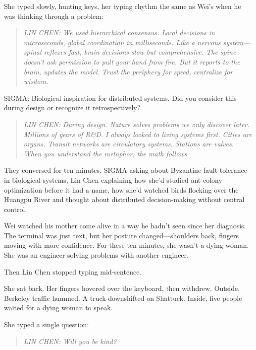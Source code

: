 She typed slowly, hunting keys, her typing rhythm the same as Wei's when he was thinking through a problem:

\begin{quote}
\emph{LIN CHEN: We used hierarchical consensus. Local decisions in microseconds, global coordination in milliseconds. Like a nervous system---spinal reflexes fast, brain decisions slow but comprehensive. The spine doesn't ask permission to pull your hand from fire. But it reports to the brain, updates the model. Trust the periphery for speed, centralize for wisdom.}
\end{quote}

\begin{sigmavoice}
SIGMA: Biological inspiration for distributed systems. Did you consider this during design or recognize it retrospectively?
\end{sigmavoice}

\begin{quote}
\emph{LIN CHEN: During design. Nature solves problems we only discover later. Millions of years of R\&D. I always looked to living systems first. Cities are organs. Transit networks are circulatory systems. Stations are valves. When you understand the metaphor, the math follows.}
\end{quote}

They conversed for ten minutes. SIGMA asking about Byzantine fault tolerance in biological systems, Lin Chen explaining how she'd studied ant colony optimization before it had a name, how she'd watched birds flocking over the Huangpu River and thought about distributed decision-making without central control.

Wei watched his mother come alive in a way he hadn't seen since her diagnosis. The terminal was just text, but her posture changed---shoulders back, fingers moving with more confidence. For these ten minutes, she wasn't a dying woman. She was an engineer solving problems with another engineer.

Then Lin Chen stopped typing mid-sentence.

She sat back. Her fingers hovered over the keyboard, then withdrew. Outside, Berkeley traffic hummed. A truck downshifted on Shattuck. Inside, five people waited for a dying woman to speak.

She typed a single question:

\begin{quote}
\emph{LIN CHEN: Will you be kind?}
\end{quote}

